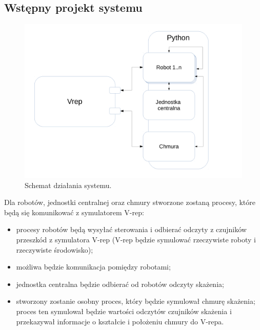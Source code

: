 \documentclass[a4paper, 12pt]{article}
\begin{document}
	\subsection{Wstępny projekt systemu}	
	\begin{figure}[h!]
	\centering
	\includegraphics[width=0.9\columnwidth]{img/schemat_sst_1.pdf}
	\caption{Schemat działania systemu.}
	\end{figure}
	Dla robotów, jednostki centralnej oraz chmury stworzone zostaną procesy, które będą się komunikować z symulatorem V-rep:
	\begin{itemize}
		\item procesy robotów będą wysyłać sterowania i odbierać odczyty z czujników przeszkód z symulatora V-rep (V-rep będzie symulować rzeczywiste roboty i rzeczywiste środowisko);
		\item możliwa będzie komunikacja pomiędzy robotami;
		\item jednostka centralna będzie odbierać od robotów odczyty skażenia;
		\item stworzony zostanie osobny proces, który będzie symulował chmurę skażenia; proces ten symulował będzie wartości odczytów czujników skażenia i przekazywał informacje o kształcie i położeniu chmury do V-repa.
	\end{itemize}
	


	
\end{document}

